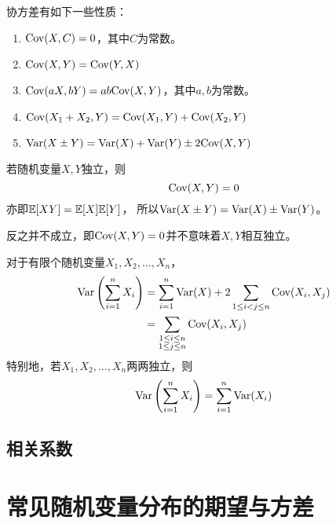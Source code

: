 \begin{theorem}[协方差的性质]
  协方差有如下一些性质：
  \begin{enumerate}
    \item 
    $\textrm{Cov}(X,C) = 0$，其中$C$为常数。
    \item
    $\textrm{Cov}(X,Y) = \textrm{Cov}(Y,X)$
    \item 
    $\textrm{Cov}(aX,bY)=ab\textrm{Cov}(X,Y)$，其中$a,b$为常数。
    \item 
    $\textrm{Cov}(X_1+X_2,Y)=\textrm{Cov}(X_1,Y)+\textrm{Cov}(X_2,Y)$
    \item 
    $\textrm{Var}(X\pm Y)=\textrm{Var}(X)+\textrm{Var}(Y)\pm 2\textrm{Cov}(X,Y)$
  \end{enumerate}
\end{theorem}

\begin{theorem}[相互独立的随机变量的协方差]
  若随机变量$X,Y$独立，则
  \begin{displaymath}
    \textrm{Cov}(X,Y) = 0
  \end{displaymath}
  亦即$\mathbb{E}[XY]=\mathbb{E}[X]\mathbb{E}[Y]$，
  所以$\textrm{Var}(X\pm Y) = \textrm{Var}(X)\pm \textrm{Var}(Y)$。
\end{theorem}

\begin{remark}
  反之并不成立，即$\textrm{Cov}(X,Y)=0$并不意味着$X,Y$相互独立。
\end{remark}

\begin{theorem}[随机变量和的方差]
  对于有限个随机变量$X_1,X_2,\dots,X_n$，
  \begin{align*}
    \textrm{Var}\left(\sum_{i=1}^{n}X_i\right)
    &= \sum_{i=1}^{n}\textrm{Var}(X) + 2\sum_{1\le i<j\le n}\textrm{Cov}(X_i,X_j) \\
    &= \sum_{\substack{1\le i\le n \\ 1\le j\le n}}\textrm{Cov}(X_i,X_j)
  \end{align*}
  特别地，若$X_1,X_2,\dots,X_n$两两独立，则
  \begin{displaymath}
    \textrm{Var}\left(\sum_{i=1}^{n}X_i\right) = \sum_{i=1}^{n}\textrm{Var}(X_i)
  \end{displaymath}
\end{theorem}

\subsection{相关系数} \label{subset-correlation-coefficent}

\section{常见随机变量分布的期望与方差}

